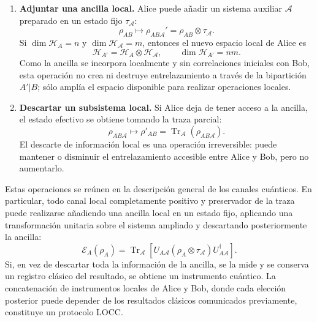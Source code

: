 \documentclass[12pt,a4paper]{article}
\theoremstyle{definition}
\theoremstyle{plain}
\theoremstyle{remark}
\newcommand{\Hil}{\mathcal{H}}
\newcommand{\TrA}{\operatorname{Tr}}
\begin{document}
\begin{enumerate}
    \item \textbf{Adjuntar una ancilla local.} Alice puede añadir un sistema auxiliar $\mathcal{A}$ preparado en un estado fijo $\tau_{\mathcal{A}}$:
    \begin{equation*}
        \rho_{AB}
        \longmapsto
        \rho_{AB\mathcal{A}}'
        =\rho_{AB}\otimes\tau_{\mathcal{A}}.
    \end{equation*}
    Si $\dim\Hil_A=n$ y $\dim\Hil_{\mathcal{A}}=m$, entonces el nuevo espacio local de Alice es
    \begin{equation*}
        \Hil_{A'}=\Hil_A\otimes\Hil_{\mathcal{A}},
        \qquad
        \dim\Hil_{A'}=nm.
    \end{equation*}
    Como la ancilla se incorpora localmente y sin correlaciones iniciales con Bob, esta operación no crea ni destruye entrelazamiento a través de la bipartición $A'|B$; sólo amplía el espacio disponible para realizar operaciones locales.

    \item \textbf{Descartar un subsistema local.} Si Alice deja de tener acceso a la ancilla, el estado efectivo se obtiene tomando la traza parcial:
    \begin{equation*}
        \rho_{AB\mathcal{A}}
        \longmapsto
        \rho'_{AB}
        =\TrA_{\mathcal{A}}\!\left(\rho_{AB\mathcal{A}}\right).
    \end{equation*}
    El descarte de información local es una operación irreversible: puede mantener o disminuir el entrelazamiento accesible entre Alice y Bob, pero no aumentarlo.
\end{enumerate}

Estas operaciones se reúnen en la descripción general de los canales cuánticos. En particular, todo canal local completamente positivo y preservador de la traza puede realizarse añadiendo una ancilla local en un estado fijo, aplicando una transformación unitaria sobre el sistema ampliado y descartando posteriormente la ancilla:
\begin{equation*}
    \mathcal{E}_A(\rho_A)
    =\TrA_{\mathcal{A}}\!\left[
        U_{A\mathcal{A}}
        \left(\rho_A\otimes\tau_{\mathcal{A}}\right)
        U_{A\mathcal{A}}^{\dagger}
    \right].
\end{equation*}
Si, en vez de descartar toda la información de la ancilla, se la mide y se conserva un registro clásico del resultado, se obtiene un instrumento cuántico. La concatenación de instrumentos locales de Alice y Bob, donde cada elección posterior puede depender de los resultados clásicos comunicados previamente, constituye un protocolo LOCC.
\end{document}
